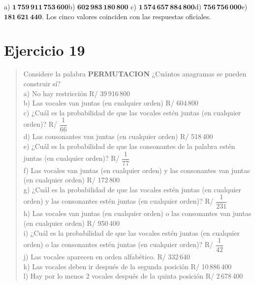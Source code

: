 \documentclass[11pt]{article}
\begin{document}
\begin{resp}
a) $\mathbf{1\,759\,911\,753\,600}$\quad b) $\mathbf{602\,983\,180\,800}$\quad
c) $\mathbf{1\,574\,657\,884\,800}$\quad d) $\mathbf{756\,756\,000}$\quad e) $\mathbf{181\,621\,440}$.
Los cinco valores coinciden con las respuestas oficiales.
\end{resp}

\section*{Ejercicio 19}

\begin{quote}
Considere la palabra \textbf{PERMUTACION} ¿Cuántos anagramas se pueden construir sí?\\
a) No hay restricción \hfill R/ 39\,916\,800\\
b) Las vocales van juntas (en cualquier orden) \hfill R/ 604\,800\\
c) ¿Cuál es la probabilidad de que las vocales estén juntas (en cualquier orden)? \hfill R/ $\dfrac{1}{66}$\\
d) Las consonantes van juntas (en cualquier orden) \hfill R/ 518\,400\\
e) ¿Cuál es la probabilidad de que las consonantes de la palabra estén juntas (en cualquier orden)?
\hfill R/ $\dfrac{1}{77}$\\
f) Las vocales van juntas (en cualquier orden) y las consonantes van juntas (en cualquier orden)
\hfill R/ 172\,800\\
g) ¿Cuál es la probabilidad de que las vocales estén juntas (en cualquier orden) y las consonantes estén
juntas (en cualquier orden)? \hfill R/ $\dfrac{1}{231}$\\
h) Las vocales van juntas (en cualquier orden) o las consonantes van juntas (en cualquier orden)
\hfill R/ 950\,400\\
i) ¿Cuál es la probabilidad de que las vocales estén juntas (en cualquier orden) o las consonantes estén
juntas (en cualquier orden)? \hfill R/ $\dfrac{1}{42}$\\
j) Las vocales aparecen en orden alfabético. \hfill R/ 332\,640\\
k) Las vocales deben ir después de la segunda posición \hfill R/ 10\,886\,400\\
l) Hay por lo menos 2 vocales después de la quinta posición \hfill R/ 2\,678\,400
\end{quote}
\end{document}
